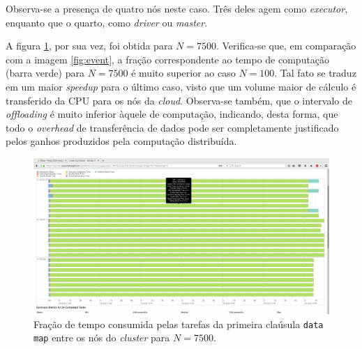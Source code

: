 \documentclass[12pt, a4paper]{article}
\begin{document}
Observa-se a presença de quatro nós neste caso. Três deles agem como
\textit{executor}, enquanto que o quarto, como \textit{driver} ou
\textit{master}.

\vspace{12pt}

A figura \ref{fig:event5000}, por sua vez, foi obtida para \(N = 7500\).
Verifica-se que, em comparação com a imagem \ref{fig:event}, a fração correspondente ao tempo de
computação (barra verde) para \( N = 7500\) é muito superior ao caso \(N =
100\). Tal fato se traduz em um maior \textit{speedup} para o último caso,
visto que um volume maior de cálculo é transferido da CPU para os
nós da \textit{cloud}. Observa-se também, que o intervalo de
\textit{offloading} é muito inferior àquele de computação, indicando, desta
forma, que todo o \textit{overhead} de transferência de dados pode ser
completamente justificado pelos ganhos produzidos pela computação distribuída.

\begin{figure}[h!] 
    \centering
    \includegraphics[width=\textwidth]{img/7500/event}
    \caption{Fração de tempo consumida pelas tarefas da primeira claúsula
    \texttt{data map} entre os nós do \textit{cluster} para \(N = 7500\).}        
    \label{fig:event5000}
\end{figure}
\end{document}
